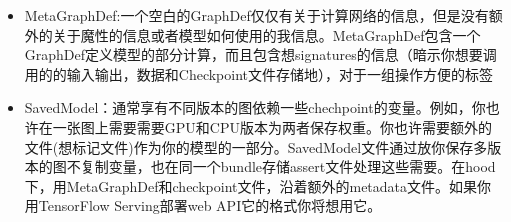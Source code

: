 \begin{itemize}
\item MetaGraphDef:一个空白的GraphDef仅仅有关于计算网络的信息，但是没有额外的关于魔性的信息或者模型如何使用的我信息。MetaGraphDef包含一个GraphDef定义模型的部分计算，而且包含想signatures的信息（暗示你想要调用的的输入输出，数据和Checkpoint文件存储地），对于一组操作方便的标签
\item SavedModel：通常享有不同版本的图依赖一些chechpoint的变量。例如，你也许在一张图上需要需要GPU和CPU版本为两者保存权重。你也许需要额外的文件(想标记文件)作为你的模型的一部分。SavedModel文件通过放你保存多版本的图不复制变量，也在同一个bundle存储assert文件处理这些需要。在hood下，用MetaGraphDef和checkpoint文件，沿着额外的metadata文件。如果你用TensorFlow Serving部署web API它的格式你将想用它。
\end{itemize}






































